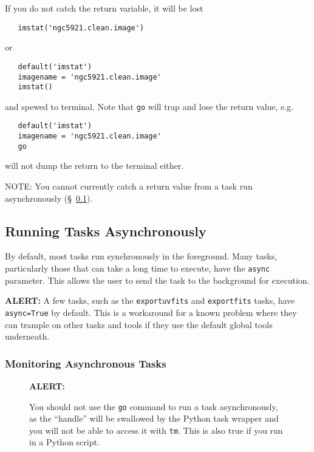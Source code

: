 If you do not catch the return variable, it will be lost
\small
\begin{verbatim}
   imstat('ngc5921.clean.image')
\end{verbatim}
\normalsize
 or
\small
\begin{verbatim}
   default('imstat')
   imagename = 'ngc5921.clean.image'
   imstat()
\end{verbatim}
\normalsize
and spewed to terminal.  Note that {\tt go} will trap and lose
the return value, e.g.
\small
\begin{verbatim}
   default('imstat')
   imagename = 'ngc5921.clean.image'
   go
\end{verbatim}
\normalsize
will not dump the return to the terminal either.

NOTE: You cannot currently catch a return value from a task run
asynchronously (\S~\ref{section:intro.tasks.async}).

\subsection{Running Tasks Asynchronously}
\label{section:intro.tasks.async}

By default, most tasks run synchronously in the foreground.  Many
tasks, particularly those that can take a long time to execute,
have the {\tt async} parameter.  This allows the user to send the
task to the background for execution.

{\bf ALERT:} A few tasks, such as the {\tt exportuvfits} and
{\tt exportfits} tasks, have {\tt async=True} by default.  This
is a workaround for a known problem where they can trample on other
tasks and tools if they use the default global tools underneath.

\subsubsection{Monitoring Asynchronous Tasks}
\label{section:intro.tasks.async.tm}


\begin{wrapfigure}{r}{2.5in}
  \begin{boxedminipage}{2.5in}
     \centerline{\bf ALERT:}
     You should not use the {\tt go} command to run a task
     asynchronously, as the ``handle'' will be swallowed by
     the Python task wrapper and you will not be able to
     access it with {\tt tm}.  This is also true if you run
     in a Python script.
  \end{boxedminipage}
\end{wrapfigure}

